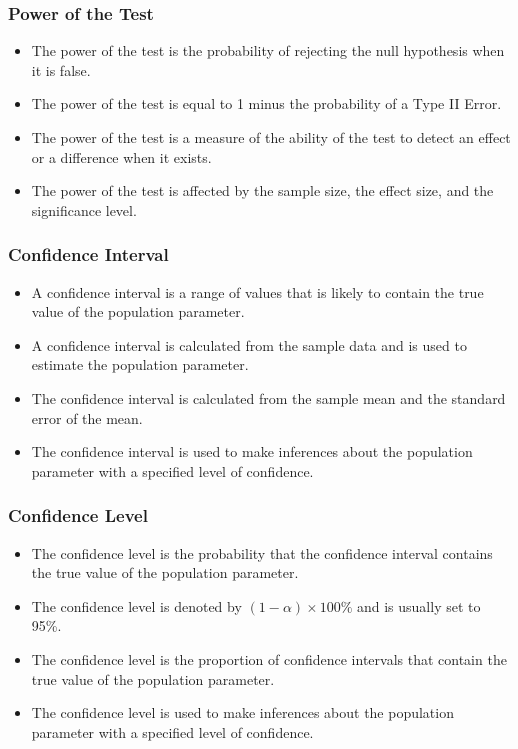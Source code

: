 \documentclass[serif, 9pt, aspectratio=32]{beamer}
\begin{document}
\begin{frame}
    \frametitle{Power of the Test}
    \begin{itemize}
        \setlength{\itemsep}{2em}
        \item The power of the test is the probability of rejecting the null hypothesis when it is false.
        \item The power of the test is equal to 1 minus the probability of a Type II Error.
        \item The power of the test is a measure of the ability of the test to detect an effect or a difference when it exists.
        \item The power of the test is affected by the sample size, the effect size, and the significance level.
    \end{itemize}
\end{frame}

\begin{frame}
    \frametitle{Confidence Interval}
    \begin{itemize}
        \setlength{\itemsep}{2em}
        \item A confidence interval is a range of values that is likely to contain the true value of the population parameter.
        \item A confidence interval is calculated from the sample data and is used to estimate the population parameter.
        \item The confidence interval is calculated from the sample mean and the standard error of the mean.
        \item The confidence interval is used to make inferences about the population parameter with a specified level of confidence.
    \end{itemize}
\end{frame}

\begin{frame}
    \frametitle{Confidence Level}
    \begin{itemize}
        \setlength{\itemsep}{2em}
        \item The confidence level is the probability that the confidence interval contains the true value of the population parameter.
        \item The confidence level is denoted by $(1 - \alpha) \times 100\%$ and is usually set to 95\%.
        \item The confidence level is the proportion of confidence intervals that contain the true value of the population parameter.
        \item The confidence level is used to make inferences about the population parameter with a specified level of confidence.
    \end{itemize}
\end{frame}
\end{document}
